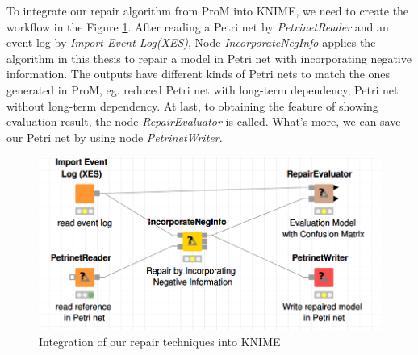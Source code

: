 To integrate our repair algorithm from ProM into KNIME, we need to create the workflow in the Figure \ref{fig:impl-KNIME}. After reading a Petri net by  \emph{PetrinetReader} and an event log by \emph{Import Event Log(XES)}, Node \emph{IncorporateNegInfo} applies the algorithm in this thesis to repair a model in Petri net with incorporating negative information. The outputs have different kinds of Petri nets to match the ones generated in ProM, eg. reduced Petri net with long-term dependency, Petri net without long-term dependency. At last, to obtaining the feature of showing evaluation result, the node \emph{RepairEvaluator} is called. What's more, we can save our Petri net by using node \emph{PetrinetWriter}.
\begin{figure}
	\centering
	\includegraphics[width=\textwidth]{figures/implementation/implementation-KNIME.png}
	\caption{Integration of our repair techniques into KNIME}
	\label{fig:impl-KNIME}
\end{figure}
